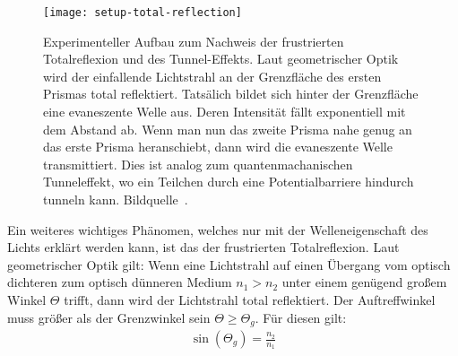 \documentclass[a4paper,10pt,twocolumn]{article}
\begin{document}
    \begin{figure}[htbp]
        \texttt{[image: setup-total-reflection]}
        \centering
        \caption{
        Experimenteller Aufbau zum Nachweis der frustrierten Totalreflexion und des Tunnel-Effekts.
        Laut geometrischer Optik wird der einfallende Lichtstrahl an der Grenzfläche des ersten Prismas
        total reflektiert.
        Tatsälich bildet sich hinter der Grenzfläche eine evaneszente Welle aus.
        Deren Intensität fällt exponentiell mit dem Abstand ab.
        Wenn man nun das zweite Prisma nahe genug an das erste Prisma heranschiebt, dann wird die evaneszente
        Welle transmittiert.
        Dies ist analog zum quantenmachanischen Tunneleffekt, wo ein Teilchen durch eine Potentialbarriere
        hindurch tunneln kann.
        Bildquelle~\cite{instr}.
        }
        \label{fig:SetupTotalReflection}
    \end{figure}
    

    
    Ein weiteres wichtiges Phänomen, welches nur mit der Welleneigenschaft des Lichts erklärt werden kann,
    ist das der frustrierten Totalreflexion.
    Laut geometrischer Optik gilt: Wenn eine Lichtstrahl auf einen Übergang vom optisch dichteren
    zum optisch dünneren Medium $n_1 > n_2$ unter einem genügend großem Winkel $\Theta$ trifft,
    dann wird der Lichtstrahl total reflektiert.
    Der Auftreffwinkel muss größer als der Grenzwinkel sein $\Theta \geq \Theta_g$.
    Für diesen gilt:
    \begin{align*}
        \sin(\Theta_g) = \frac{n_2}{n_1}
    \end{align*}
    
\end{document}
